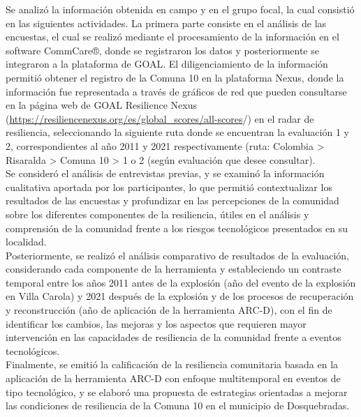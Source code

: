 \documentclass[
  letterpaper,
]{book}
\begin{document}
Se analizó la información obtenida en campo y en el grupo focal, la cual
consistió en las siguientes actividades. La primera parte consiste en el
análisis de las encuestas, el cual se realizó mediante el procesamiento
de la información en el software CommCare®, donde se registraron los
datos y posteriormente se integraron a la plataforma de GOAL. El
diligenciamiento de la información permitió obtener el registro de la
Comuna 10 en la plataforma Nexus, donde la información fue representada
a través de gráficos de red que pueden consultarse en la página web de
GOAL Resilience Nexus
(\url{https://resiliencenexus.org/es/global_scores/all-scores}/) en el
radar de resiliencia, seleccionando la siguiente ruta donde se
encuentran la evaluación 1 y 2, correspondientes al año 2011 y 2021
respectivamente (ruta: Colombia \textgreater{} Risaralda \textgreater{}
Comuna 10 \textgreater{} 1 o 2 (según evaluación que desee consultar).\\
Se consideró el análisis de entrevistas previas, y se examinó la
información cualitativa aportada por los participantes, lo que permitió
contextualizar los resultados de las encuestas y profundizar en las
percepciones de la comunidad sobre los diferentes componentes de la
resiliencia, útiles en el análisis y comprensión de la comunidad frente
a los riesgos tecnológicos presentados en su localidad.\\
Posteriormente, se realizó el análisis comparativo de resultados de la
evaluación, considerando cada componente de la herramienta y
estableciendo un contraste temporal entre los años 2011 antes de la
explosión (año del evento de la explosión en Villa Carola) y 2021
después de la explosión y de los procesos de recuperación y
reconstrucción (año de aplicación de la herramienta ARC-D), con el fin
de identificar los cambios, las mejoras y los aspectos que requieren
mayor intervención en las capacidades de resiliencia de la comunidad
frente a eventos tecnológicos.\\
Finalmente, se emitió la calificación de la resiliencia comunitaria
basada en la aplicación de la herramienta ARC-D con enfoque
multitemporal en eventos de tipo tecnológico, y se elaboró una propuesta
de estrategias orientadas a mejorar las condiciones de resiliencia de la
Comuna 10 en el municipio de Dosquebradas.
\end{document}
